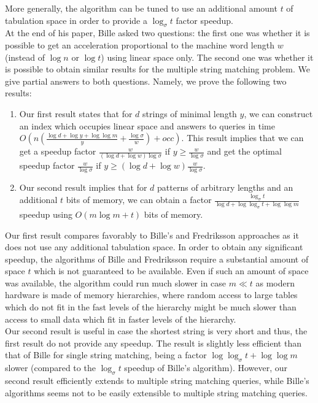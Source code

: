 \documentclass{article}
\newcommand{\?}{\mskip1.5mu}
\begin{document}
More generally, the algorithm can be tuned to use an additional amount $t$ of tabulation space in order to provide a $\log_\sigma t$ factor speedup. 
\\At the end of his paper, Bille asked two questions: the first one was whether it is possible to get an acceleration proportional to the machine word length $w$ (instead of $\log n$ or $\log t$) using linear space only. The second one was whether it is possible to obtain similar results for the multiple string matching problem. We give partial answers to both questions. Namely, we prove the following two results:
\begin{enumerate}
\item Our first result states that for $d$ strings of minimal length $y$, we can construct an index which occupies linear space and answers to queries in time $O(n(\frac{\log d+\log y+\log\log m}{y}+\frac{\log\sigma}{w})+occ)$. This result implies that we can get a speedup factor $\frac{w}{(\log d+\log w)\log\sigma}$ if $y\geq \frac{w}{\log\sigma}$ and get the optimal speedup factor $\frac{w}{\log\sigma}$ if $y\geq (\log d+\log w)\frac{w}{\log\sigma}$. 
\item Our second result implies that for $d$ patterns of arbitrary lengths and an additional $t$ bits of memory, we can obtain a factor $\frac{\log_\sigma t}{\log d+\log\log_\sigma t+\log\log m}$ speedup using $O(m\log m+t)$ bits of memory.
\end{enumerate}
Our first result compares favorably to Bille's and Fredriksson approaches as it does not use any additional tabulation space. In order to obtain any significant speedup, the algorithms of Bille and Fredriksson require a substantial amount of space $t$ which is not guaranteed to be available. Even if such an amount of space was available, the algorithm could run much slower in case $m\ll t$ as modern hardware is made of memory hierarchies, where random access to large tables which do not fit in the fast levels of the hierarchy might be much slower than access to small data which fit in faster levels of the hierarchy. 
\\ 
Our second result is useful in case the shortest string is very short and thus, the first result do not provide any speedup. The result is slightly less efficient than that of Bille for single string matching, being a factor $\log\log_\sigma t+\log\log m$ slower (compared to the $\log_\sigma t$ speedup of Bille's algorithm). However, our second result efficiently extends to multiple string matching queries, while Bille's algorithms seems not to be easily extensible to multiple string matching queries.\\
\end{document}
